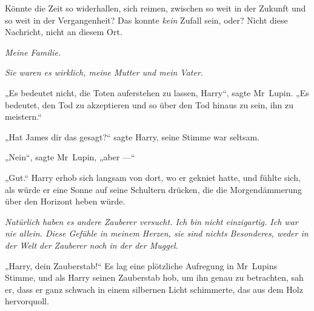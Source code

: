 Könnte die Zeit so widerhallen, sich reimen, zwischen so weit in der Zukunft und so weit in der Vergangenheit? Das konnte \emph{kein} Zufall sein, oder? Nicht diese Nachricht, nicht an diesem Ort.

\emph{Meine Familie.}

\emph{Sie waren es wirklich, meine Mutter und mein Vater.}

„Es bedeutet nicht, die Toten auferstehen zu lassen, Harry“, sagte Mr~Lupin.
„Es bedeutet, den Tod zu akzeptieren und so über den Tod hinaus zu sein, ihn zu meistern.“

„Hat James dir das gesagt?“ sagte Harry, seine Stimme war seltsam.

„Nein“, sagte Mr~Lupin, „aber —“


„Gut.“ Harry erhob sich langsam von dort, wo er gekniet hatte, und fühlte sich, als würde er eine Sonne auf seine Schultern drücken, die die Morgendämmerung über den Horizont heben würde.

\emph{Natürlich haben es andere Zauberer versucht. Ich bin nicht einzigartig. Ich war nie allein. Diese Gefühle in meinem Herzen, sie sind nichts Besonderes, weder in der Welt der Zauberer noch in der der Muggel}.

„Harry, dein Zauberstab!“ Es lag eine plötzliche Aufregung in Mr~Lupins Stimme, und als Harry seinen Zauberstab hob, um ihn genau zu betrachten, sah er, dass er ganz schwach in einem silbernen Licht schimmerte, das aus dem Holz hervorquoll.

